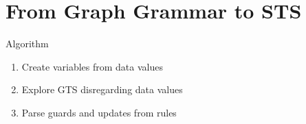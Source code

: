\documentclass{FMTslides}
\begin{document}
\section[GG2STS]{From Graph Grammar to STS}

\begin{frame}{Algorithm}
\begin{enumerate}[<+->]
\item Create variables from data values
\item Explore GTS disregarding data values
\item Parse guards and updates from rules
\end{enumerate}
\begin{figure}
\centering
    \hspace{10px}
    \hspace{10px}

\end{figure}
\end{frame}
\end{document}
